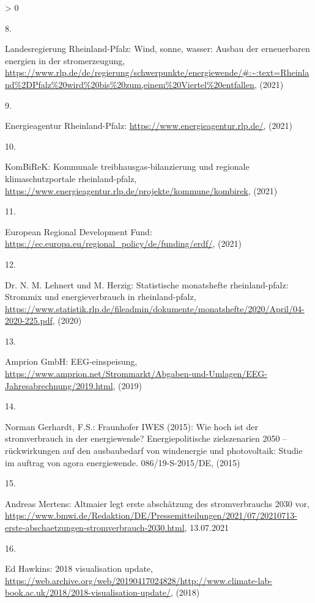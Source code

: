 \documentclass[a4paper,11pt]{article}
\newlength{\cslhangindent}
\newlength{\csllabelwidth}
\newenvironment{CSLReferences}[3] %
 {%
  \setlength{\parindent}{0pt}
  \ifodd #1 \everypar{\setlength{\hangindent}{\cslhangindent}}\ignorespaces\fi
  \ifnum #2 > 0
  \setlength{\parskip}{#2\baselineskip}
  \fi
 }%
 {}
\newcommand{\CSLLeftMargin}[1]{\parbox[t]{\maxof{\widthof{#1}}{\csllabelwidth}}{#1}}
\newcommand{\CSLRightInline}[1]{\parbox[t]{\linewidth}{#1}}
\begin{document}
\begin{CSLReferences}{0}{0}
\leavevmode\hypertarget{ref-LandesregierungRheinlandPfalz.2021}{}%
\CSLLeftMargin{8. }
\CSLRightInline{Landesregierung Rheinland-Pfalz: Wind, sonne, wasser: Ausbau der erneuerbaren energien in der stromerzeugung, \url{https://www.rlp.de/de/regierung/schwerpunkte/energiewende/\#:~:text=Rheinland\%2DPfalz\%20wird\%20bis\%20zum,einem\%20Viertel\%20entfallen}, (2021)}

\leavevmode\hypertarget{ref-EnergieagenturRheinlandPfalz.2021}{}%
\CSLLeftMargin{9. }
\CSLRightInline{Energieagentur Rheinland-Pfalz: \url{https://www.energieagentur.rlp.de/}, (2021)}

\leavevmode\hypertarget{ref-KomBiReK.2021}{}%
\CSLLeftMargin{10. }
\CSLRightInline{KomBiReK: Kommunale treibhausgas-bilanzierung und regionale klimaschutzportale rheinland-pfalz, \url{https://www.energieagentur.rlp.de/projekte/kommune/kombirek}, (2021)}

\leavevmode\hypertarget{ref-EuropeanRegionalDevelopmentFund.2021}{}%
\CSLLeftMargin{11. }
\CSLRightInline{European Regional Development Fund: \url{https://ec.europa.eu/regional_policy/de/funding/erdf/}, (2021)}

\leavevmode\hypertarget{ref-Lehnert.2020}{}%
\CSLLeftMargin{12. }
\CSLRightInline{Dr. N. M. Lehnert und M. Herzig: Statistische monatshefte rheinland-pfalz: Strommix und energieverbrauch in rheinland-pfalz, \url{https://www.statistik.rlp.de/fileadmin/dokumente/monatshefte/2020/April/04-2020-225.pdf}, (2020)}

\leavevmode\hypertarget{ref-AmprionGmbH.2019}{}%
\CSLLeftMargin{13. }
\CSLRightInline{Amprion GmbH: EEG-einspeisung, \url{https://www.amprion.net/Strommarkt/Abgaben-und-Umlagen/EEG-Jahresabrechnung/2019.html}, (2019)}

\leavevmode\hypertarget{ref-NormanGerhardt.2015}{}%
\CSLLeftMargin{14. }
\CSLRightInline{Norman Gerhardt, F.S.: Fraunhofer IWES (2015): Wie hoch ist der stromverbrauch in der energiewende? Energiepolitische zielszenarien 2050 -- r{ü}ckwirkungen auf den ausbaubedarf von windenergie und photovoltaik: Studie im auftrag von agora energiewende. 086/19-S-2015/DE, (2015)}

\leavevmode\hypertarget{ref-AndreasMertens.13.07.2021}{}%
\CSLLeftMargin{15. }
\CSLRightInline{Andreas Mertens: Altmaier legt erste absch{ä}tzung des stromverbrauchs 2030 vor, \url{https://www.bmwi.de/Redaktion/DE/Pressemitteilungen/2021/07/20210713-erste-abschaetzungen-stromverbrauch-2030.html}, 13.07.2021}

\leavevmode\hypertarget{ref-EdHawkins.2018}{}%
\CSLLeftMargin{16. }
\CSLRightInline{Ed Hawkins: 2018 visualisation update, \url{https://web.archive.org/web/20190417024828/http://www.climate-lab-book.ac.uk/2018/2018-visualisation-update/}, (2018)}


\end{CSLReferences}
\end{document}
